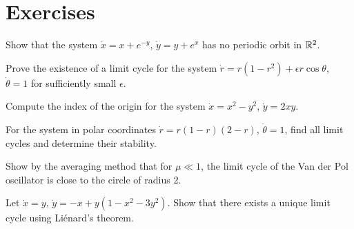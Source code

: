 \section{Exercises}

\begin{exercise}[Bendixson]
Show that the system $\dot{x} = x + e^{-y}$, $\dot{y} = y + e^x$ has no
periodic orbit in $\mathbb{R}^2$.
\end{exercise}

\begin{exercise}
Prove the existence of a limit cycle for the system
$\dot{r} = r(1-r^2) + \epsilon r\cos\theta$,
$\dot{\theta} = 1$ for sufficiently small $\epsilon$.
\end{exercise}

\begin{exercise}[Index]
Compute the index of the origin for the system
$\dot{x} = x^2 - y^2$, $\dot{y} = 2xy$.
\end{exercise}

\begin{exercise}
For the system in polar coordinates
$\dot{r} = r(1-r)(2-r)$, $\dot{\theta} = 1$, find all limit cycles and
determine their stability.
\end{exercise}

\begin{exercise}
Show by the averaging method that for $\mu \ll 1$, the limit cycle of the
Van der Pol oscillator is close to the circle of radius 2.
\end{exercise}

\begin{exercise}[Uniqueness]
Let $\dot{x} = y$, $\dot{y} = -x + y(1 - x^2 - 3y^2)$. Show that there
exists a unique limit cycle using Li\'enard's theorem.
\end{exercise}
